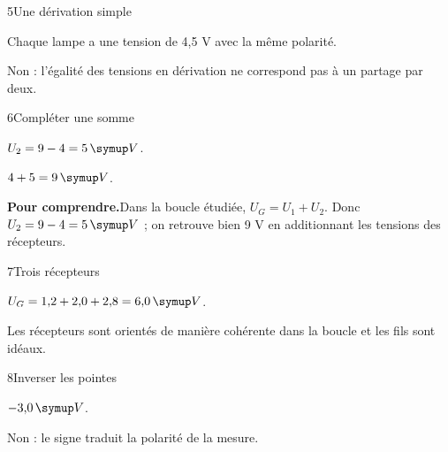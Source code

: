 \par\noindent\begin{minipage}{\linewidth}
\begin{corrige}{5}{Une dérivation simple}
\begin{questions}
\item Chaque lampe a une tension de 4,5 V avec la même polarité.
\item Non : l’égalité des tensions en dérivation ne correspond pas à un partage par deux.
\end{questions}
\end{corrige}
\end{minipage}
\par\noindent\begin{minipage}{\linewidth}
\begin{corrige}{6}{Compléter une somme}
\begin{questions}
\item $U_2=9-4=5\unite V$.
\item $4+5=9\unite V$.
\end{questions}
\par\smallskip\noindent\textbf{Pour comprendre.}\enspace Dans la boucle étudiée, $U_G=U_1+U_2$. Donc $U_2=9-4=5\unite V$ ; on retrouve bien 9 V en additionnant les tensions des récepteurs.\par
{}
\end{corrige}
\end{minipage}
\par\noindent\begin{minipage}{\linewidth}
\begin{corrige}{7}{Trois récepteurs}
\begin{questions}
\item $U_G=1{,}2+2{,}0+2{,}8=6{,}0\unite V$.
\item Les récepteurs sont orientés de manière cohérente dans la boucle et les fils sont idéaux.
\end{questions}
\end{corrige}
\end{minipage}
\par\noindent\begin{minipage}{\linewidth}
\begin{corrige}{8}{Inverser les pointes}
\begin{questions}
\item $-3{,}0\unite V$.
\item Non : le signe traduit la polarité de la mesure.
\end{questions}
\end{corrige}
\end{minipage}
